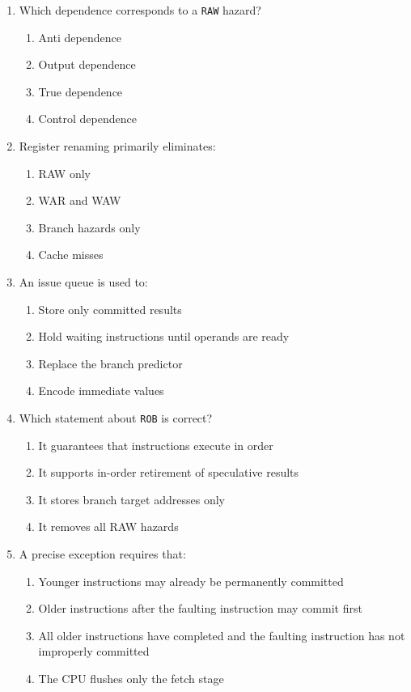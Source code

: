 \documentclass[11pt]{article}
\begin{document}
\begin{enumerate}[label=\textbf{A\arabic*.}]
  \item Which dependence corresponds to a \texttt{RAW} hazard?
  \begin{enumerate}[label=(\Alph*)]
    \item Anti dependence
    \item Output dependence
    \item True dependence
    \item Control dependence
  \end{enumerate}

  \item Register renaming primarily eliminates:
  \begin{enumerate}[label=(\Alph*)]
    \item RAW only
    \item WAR and WAW
    \item Branch hazards only
    \item Cache misses
  \end{enumerate}

  \item An issue queue is used to:
  \begin{enumerate}[label=(\Alph*)]
    \item Store only committed results
    \item Hold waiting instructions until operands are ready
    \item Replace the branch predictor
    \item Encode immediate values
  \end{enumerate}

  \item Which statement about \texttt{ROB} is correct?
  \begin{enumerate}[label=(\Alph*)]
    \item It guarantees that instructions execute in order
    \item It supports in-order retirement of speculative results
    \item It stores branch target addresses only
    \item It removes all RAW hazards
  \end{enumerate}

  \item A precise exception requires that:
  \begin{enumerate}[label=(\Alph*)]
    \item Younger instructions may already be permanently committed
    \item Older instructions after the faulting instruction may commit first
    \item All older instructions have completed and the faulting instruction has not improperly committed
    \item The CPU flushes only the fetch stage
  \end{enumerate}


\end{enumerate}
\end{document}
